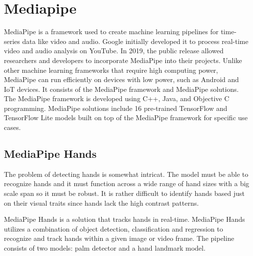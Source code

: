 



\section{Mediapipe}
MediaPipe is a framework used to create machine learning pipelines for time-series data like video and audio. Google initially developed it to process real-time video and audio analysis on YouTube. In 2019, the public release allowed researchers and developers to incorporate MediaPipe into their projects. Unlike other machine learning frameworks that require high computing power, MediaPipe can run efficiently on devices with low power, such as Android and IoT devices. It consists of the MediaPipe framework and MediaPipe solutions. The MediaPipe framework is developed using C++, Java, and Objective C programming. MediaPipe solutions include 16 pre-trained TensorFlow and TensorFlow Lite models built on top of the MediaPipe framework for specific use cases. 


\subsection*{MediaPipe Hands}
The problem of detecting hands is somewhat intricat. The model must be able to recognize hands and it must function across a wide range of hand sizes with a big scale span so it must be robust. It is rather difficult to identify hands based just on their visual traits since hands lack the high contrast patterns.%


MediaPipe Hands is a solution that tracks hands in real-time. MediaPipe Hands utilizes a combination of object detection, classification and regression to recognize and track hands within a given image or video frame. The pipeline consists of two models: palm detector and a hand landmark model.


